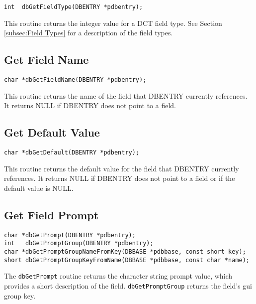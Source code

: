 \begin{verbatim}
int  dbGetFieldType(DBENTRY *pdbentry);
\end{verbatim}

This routine returns the integer value for a DCT field type.
See Section \ref{subsec:Field Types} for a description of the field types.

\subsection{Get Field Name}

\begin{verbatim}
char *dbGetFieldName(DBENTRY *pdbentry);
\end{verbatim}

This routine returns the name of the field that DBENTRY currently references. It returns NULL if DBENTRY does not 
point to a field.

\subsection{Get Default Value}

\begin{verbatim}
char *dbGetDefault(DBENTRY *pdbentry);
\end{verbatim}

This routine returns the default value for the field that DBENTRY currently references. It returns NULL if DBENTRY 
does not point to a field or if the default value is NULL.

\subsection{Get Field Prompt}
\label{subsec:Get Field Prompt}

\begin{verbatim}
char *dbGetPrompt(DBENTRY *pdbentry);
int   dbGetPromptGroup(DBENTRY *pdbentry);
char *dbGetPromptGroupNameFromKey(DBBASE *pdbbase, const short key);
short dbGetPromptGroupKeyFromName(DBBASE *pdbbase, const char *name);
\end{verbatim}

The \verb|dbGetPrompt| routine returns the character string prompt value, which provides a short description of the field.
\verb|dbGetPromptGroup| returns the field's gui group key.

